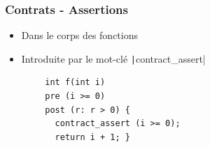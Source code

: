 \documentclass[C++.tex]{subfiles}
\begin{document}
\begin{frame}[fragile]
	\frametitle{Contrats - Assertions}
	\begin{itemize}
		\item Dans le corps des fonctions
		\item Introduite par le mot-clé \texttt|contract_assert|
	\end{itemize}

	\begin{verbatim}
		int f(int i)
		pre (i >= 0)
		post (r: r > 0) {
		  contract_assert (i >= 0);
		  return i + 1; }
	\end{verbatim}

\end{frame}
\end{document}
